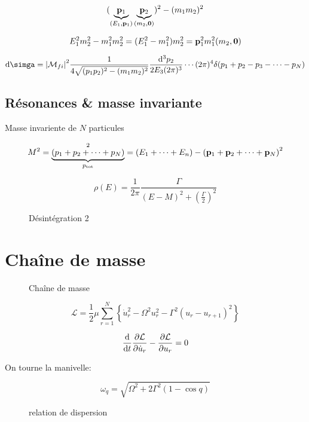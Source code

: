 $$(\underbrace{\vb{p}_1}_{(E_1 , \vb{p}_1 )}  \underbrace{\vb{p}_2}_{(m_2 , \vb{0})} )^2 - (m_1 m_2 )^2 $$ 

$$E_1^{2}m_2^{2}- m_1^{2}m_2^{2}= (E_1^{2}-m_1^{2}) m_2^{2}= \vb{p}_1^2 m_1^{2}(m_2 , \vb{0})$$ 

$$\dd \simga = \abs{ \mathcal{M}_{fi} }^{2} \frac{1}{4\sqrt{(p_1 p_2 )^2 - (m_1 m_2 )^2 }} \frac{\dd ^3 p_2 }{2 E_3 (2\pi) ^3} \dotsb (2\pi)^4 \delta(p_1 + p_2 - p_3 - \dotsb - p_N )  $$ 

\subsection*{Résonances \& masse invariante}

Masse invariente de $N$ particules 



$$M^{2}= \underbrace{\left( p_1 + p_2 + \dotsb + p_N \right)}_{p_{\text{tot}} } ^2 = \left( E_1 + \dotsb + E_n  \right) - \left( \vb{p}_1 + \vb{p}_2 + \dotsb + \vb{p}_N \right)^2$$ 

$$\rho(E) = \frac{1}{2\pi} \frac{\Gamma}{(E-M)^2 + \left( \frac{\Gamma}{2}  \right) ^2} $$ 



\begin{figure}[ht]
    \centering
    \caption{Désintégration 2}
    \label{fig:désintégration-2}
\end{figure}


\clearpage

\section*{Chaîne de masse \mu}



\begin{figure}[ht]
    \centering
    \caption{Chaîne de masse}
    \label{fig:chaîne-de-masse}
\end{figure}


$$\mathcal{L}  = \frac{1}{2} \mu \sum_{r=1}^{N} \left\{ \dot u_r^{2} -\Omega^{2} u_r^{2} -\Gamma ^2 \left( u_r -u_{r+1}  \right) ^2 \right\} $$ 

$$\dv{{}}{t} \pdv{\mathcal{L}}{\dot u_{r}} - \pdv{ \mathcal{L}  }{u_{r}} = 0  $$ 

On tourne la manivelle: 

$$\omega_q = \sqrt{\Omega^{2}+ 2\Gamma^{2}(1-\cos q)}$$ 

\begin{figure}[ht]
    \centering
    \caption{relation de dispersion}
    \label{fig:relation-de-dispersion}
\end{figure}


